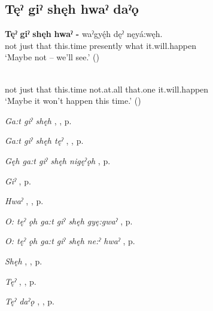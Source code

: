 \subsection*{\textbf{Tęˀ giˀ shęh hwaˀ daˀǫ} } \label{p:[tęˀ giˀ shęh hwaˀ daˀǫ]}

\ea
\label{ex:tpart34}
\gll \textbf{Tęˀ} \textbf{giˀ} \textbf{shęh} \textbf{hwaˀ -} waˀgyę́h dęˀ nęyá:węh.\\
not just that this.time presently what it.will.happen\\
\glt ‘Maybe not – we’ll see.’ (\cite{carrier_legends_2013})
\z

\ea
\label{ex:tpart35}
\\
not just that this.time not.at.all that.one it.will.happen\\
\glt ‘Maybe it won’t happen this time.’ (\cite{henry_de_2005})
\z

\begin{CayugaRelated}
\item \textit{Ga:t giˀ shęh} , , p. \pageref{p:[ga:t giˀ shęh]}\\
\item \textit{Ga:t giˀ shęh tęˀ} , , p. \pageref{p:[ga:t giˀ shęh tęˀ]}\\
\item \textit{Gęh ga:t giˀ shęh nigęˀǫh} , p. \pageref{p:[gęh ga:t giˀ shęh nigęˀǫh]}\\
\item \textit{Giˀ} , p. \pageref{p:[giˀ]}\\
\item \textit{Hwaˀ} , , p. \pageref{p:[hwaˀ]}\\
\item \textit{O: tęˀ ǫh ga:t giˀ shęh gyę:gwaˀ} , p. \pageref{p:[o: tęˀ ǫh ga:t giˀ shęh gyę:gwaˀ]}\\
\item \textit{O: tęˀ ǫh ga:t giˀ shęh ne:ˀ hwaˀ} , p. \pageref{p:[o: tęˀ ǫh ga:t giˀ shęh ne:ˀ hwaˀ]}\\
\item \textit{Shęh} , , p. \pageref{p:[shęh] `that’}\\
\item \textit{Tęˀ} , , p. \pageref{p:[tęˀ]}\\
\item \textit{Tęˀ daˀǫ} , , p. \pageref{p:[tęˀ daˀǫ]}
\end{CayugaRelated}

